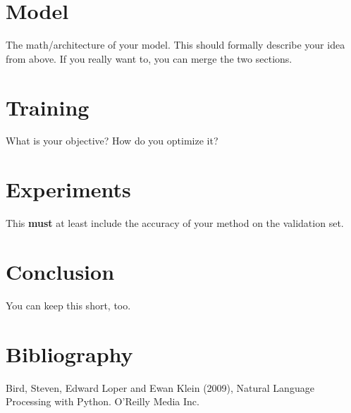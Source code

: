 \documentclass{article}
\begin{document}
\section{Model}
The math/architecture of your model. This should formally describe your idea from above. If you really want to, you can merge the two sections.

\section{Training}
What is your objective? How do you optimize it?

\section{Experiments}
This {\bf must} at least include the accuracy of your method on the validation set.

\section{Conclusion}
You can keep this short, too.

\section{Bibliography}
Bird, Steven, Edward Loper and Ewan Klein (2009), Natural Language Processing with Python. O’Reilly Media Inc.
\end{document}
